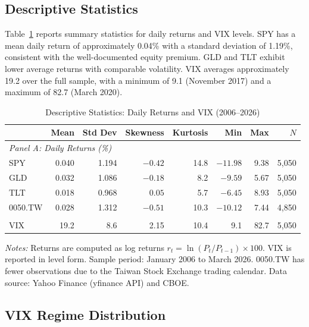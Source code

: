 \documentclass[12pt,a4paper]{article}
\begin{document}
\subsection{Descriptive Statistics}

Table~\ref{tab:desc_stats} reports summary statistics for daily returns and VIX levels. SPY has a mean daily return of approximately 0.04\% with a standard deviation of 1.19\%, consistent with the well-documented equity premium. GLD and TLT exhibit lower average returns with comparable volatility. VIX averages approximately 19.2 over the full sample, with a minimum of 9.1 (November 2017) and a maximum of 82.7 (March 2020).

\begin{table}[H]
\centering
\caption{Descriptive Statistics: Daily Returns and VIX (2006--2026)}
\label{tab:desc_stats}
\begin{threeparttable}
\begin{tabular}{lrrrrrrr}
\toprule
 & Mean & Std Dev & Skewness & Kurtosis & Min & Max & $N$ \\
\midrule
\multicolumn{8}{l}{\textit{Panel A: Daily Returns (\%)}} \\
SPY    & 0.040 & 1.194 & $-0.42$ & 14.8 & $-11.98$ & 9.38 & 5,050 \\
GLD    & 0.032 & 1.086 & $-0.18$ &  8.2 & $ -9.59$ & 5.67 & 5,050 \\
TLT    & 0.018 & 0.968 & $ 0.05$ &  5.7 & $ -6.45$ & 8.93 & 5,050 \\
0050.TW & 0.028 & 1.312 & $-0.51$ & 10.3 & $-10.12$ & 7.44 & 4,850 \\
\addlinespace
\multicolumn{8}{l}{\textit{Panel B: VIX Level}} \\
VIX    & 19.2 & 8.6 & 2.15 & 10.4 & 9.1 & 82.7 & 5,050 \\
\bottomrule
\end{tabular}
\begin{tablenotes}
\small
\item \textit{Notes:} Returns are computed as log returns $r_t = \ln(P_t/P_{t-1}) \times 100$. VIX is reported in level form. Sample period: January 2006 to March 2026. 0050.TW has fewer observations due to the Taiwan Stock Exchange trading calendar. Data source: Yahoo Finance (yfinance API) and CBOE.
\end{tablenotes}
\end{threeparttable}
\end{table}

\subsection{VIX Regime Distribution}
\end{document}
